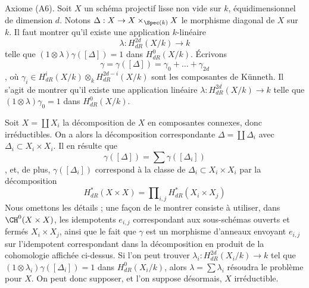 \medskip\noindent
Axiome (A6). Soit $X$ un schéma projectif lisse non vide sur $k$,
équidimensionnel de dimension $d$. Notons
$\Delta : X \to X \times_{\Spec(k)} X$
le morphisme diagonal de $X$ sur $k$. Il faut montrer qu'il
existe une application $k$-linéaire
$$
\lambda : H_{dR}^{2d}(X/k) \longrightarrow k
$$
telle que $(1 \otimes \lambda)\gamma([\Delta]) = 1$ dans $H^0_{dR}(X/k)$.
Écrivons
$$
\gamma = \gamma([\Delta]) = \gamma_0 + \ldots + \gamma_{2d}
$$,
où $\gamma_i \in H_{dR}^i(X/k) \otimes_k H_{dR}^{2d - i}(X/k)$
sont les composantes de K\"unneth. Il s'agit de montrer qu'il existe une
application linéaire $\lambda : H_{dR}^{2d}(X/k) \to k$ telle que
$(1 \otimes \lambda)\gamma_0 = 1$ dans $H^0_{dR}(X/k)$.

\medskip\noindent
Soit $X = \coprod X_i$ la décomposition de $X$ en composantes connexes,
donc irréductibles. On a alors la décomposition correspondante
$\Delta = \coprod \Delta_i$ avec $\Delta_i \subset X_i \times X_i$.
Il en résulte que
$$
\gamma([\Delta]) = \sum \gamma([\Delta_i])
$$,
et, de plus, $\gamma([\Delta_i])$ correspond à la classe de
$\Delta_i \subset X_i \times X_i$ par la décomposition
$$
H^*_{dR}(X \times X) = \prod\nolimits_{i, j} H^*_{dR}(X_i \times X_j)
$$
Nous omettons les détails ; une façon de le montrer consiste à utiliser, dans
$\CH^0(X \times X)$, les idempotents $e_{i, j}$ correspondant aux
sous-schémas ouverts et fermés $X_i \times X_j$, ainsi que le fait que
$\gamma$ est un morphisme d'anneaux envoyant $e_{i, j}$ sur
l'idempotent correspondant dans la décomposition en produit de la cohomologie affichée ci-dessus.
Si l'on peut trouver $\lambda_i : H_{dR}^{2d}(X_i/k) \to k$ tel que
$(1 \otimes \lambda_i)\gamma([\Delta_i]) = 1$ dans $H^0_{dR}(X_i/k)$,
alors $\lambda = \sum \lambda_i$ résoudra le problème pour $X$.
On peut donc supposer, et l'on suppose désormais, $X$ irréductible.


